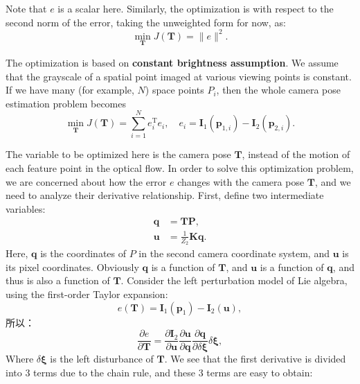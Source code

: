 Note that $e$ is a scalar here. Similarly, the optimization is with respect to the second norm of the error, taking the unweighted form for now, as:
\begin{equation}
\mathop {\min }\limits_{\mathbf{T}}  J\left( \mathbf{T}  \right) = \|e\|^2.
\end{equation}

The optimization is based on \textbf{constant brightness assumption}. We assume that the grayscale of a spatial point imaged at various viewing points is constant. If we have many (for example, $N$) space points $P_i$, then the whole camera pose estimation problem becomes
\begin{equation}
\mathop {\min }\limits_{\mathbf{T}}  J\left( \mathbf{T}  \right) = \sum\limits_{i = 1}^N {e_i^\mathrm{T}{e_i}}, \quad {e_i} = {\mathbf{I}_1}\left( {{\mathbf{p}_{1,i}}} \right) - {\mathbf{I}_2}\left( {{ \mathbf{p}_{2,i}}} \right).
\end{equation}

The variable to be optimized here is the camera pose $\mathbf{T}$, instead of the motion of each feature point in the optical flow. In order to solve this optimization problem, we are concerned about how the error $e$ changes with the camera pose $\mathbf{T}$, and we need to analyze their derivative relationship. First, define two intermediate variables:
\begin{align*}
\mathbf{q} &= \mathbf{T} \mathbf{P}, \\
\mathbf{u} &= \frac{1}{{{Z_2}}} \mathbf{K} \mathbf{q}.
\end{align*}
Here, $\mathbf{q}$ is the coordinates of $P$ in the second camera coordinate system, and $\mathbf{u}$ is its pixel coordinates. Obviously $\mathbf{q}$ is a function of $\mathbf{T}$, and $\mathbf{u}$ is a function of $\mathbf{q}$, and thus is also a function of $\mathbf{T}$. Consider the left perturbation model of Lie algebra, using the first-order Taylor expansion:
\begin{equation}
e(\mathbf{T})=\mathbf{I}_1(\mathbf{p}_{1})-\mathbf{I}_2(\mathbf{u}),
\end{equation}
所以：
\begin{equation}
\frac{\partial e}{\partial \mathbf{T}} = \frac{{\partial {\mathbf{I}_2}}}{{\partial \mathbf{u}}}\frac{{\partial \mathbf{u}}}{{\partial \mathbf{q}}}\frac{{\partial \mathbf{q}}}{{\partial \delta \mathbf{\xi} }}\delta \mathbf{\xi},
\end{equation}
Where $\delta \mathbf{\xi}$ is the left disturbance of $\mathbf{T}$. We see that the first derivative is divided into 3 terms due to the chain rule, and these 3 terms are easy to obtain:

